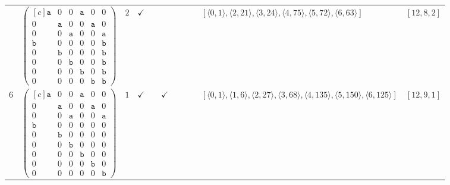 \documentclass[12pt]{article}
\theoremstyle{definition}
\theoremstyle{plain}
\begin{document}
{\begin{longtable}{@{}cYcccccccZc@{}}
\cmidrule(lr){2-11}


& $\begin{pmatrix*}[c]
\mathtt{a}  &  0  &  0  &  \mathtt{a}  &  0  &  0  \\
0  &  \mathtt{a}  &  0  &  0  &  \mathtt{a}  &  0  \\
0  &  0  &  \mathtt{a}  &  0  &  0  &  \mathtt{a}  \\
\mathtt{b}  &  0  &  0  &  0  &  0  &  \mathtt{b}  \\
0  &  \mathtt{b}  &  0  &  0  &  0  &  \mathtt{b}  \\
0  &  0  &  \mathtt{b}  &  0  &  0  & \mathtt{b}   \\
0  &  0  &  0  &  \mathtt{b}  &  0   &  \mathtt{b}  \\
0  &  0  &  0  &  0  &  \mathtt{b}   &  \mathtt{b}
\end{pmatrix*}$
& $2$
& $\checkmark$
&
&
&
&
&
& $[\langle0,1\rangle,\allowbreak\langle2,21\rangle,\allowbreak\langle3,24\rangle,\allowbreak\langle4,75\rangle,\allowbreak\langle5,72\rangle,\allowbreak\langle6,63\rangle]$
& $[12,8,2]$ \\


$6$
& $\begin{pmatrix*}[c]
\mathtt{a}  &  0  &  0  &  \mathtt{a}  &  0  &  0  \\
0  &  \mathtt{a}  &  0  &  0  &  \mathtt{a}  &  0  \\
0  &  0  &  \mathtt{a}  &  0  &  0  &  \mathtt{a}  \\
\mathtt{b}  &  0  &  0  &  0  &  0  &  0  \\
0  &  \mathtt{b}  &  0  &  0  &  0  & 0  \\
0  &  0  &  \mathtt{b}  &  0  &  0  & 0   \\
0  &  0  &  0  &  \mathtt{b}  &  0   &  0  \\
0  &  0  &  0  &  0  &  \mathtt{b}   &  0  \\
0  &  0  &  0  &  0  &  0   &  \mathtt{b}
\end{pmatrix*}$
& $1$
& $\checkmark$
&
& $\checkmark$
&
&
&
& $[\langle0,1\rangle,\allowbreak\langle1,6\rangle,\allowbreak\langle2,27\rangle,\allowbreak\langle3,68\rangle,\allowbreak\langle4,135\rangle,\allowbreak\langle5,150\rangle,\allowbreak\langle6,125\rangle]$
& $[12,9,1]$     \\

\cmidrule(lr){2-11}



\end{longtable}}
\end{document}
